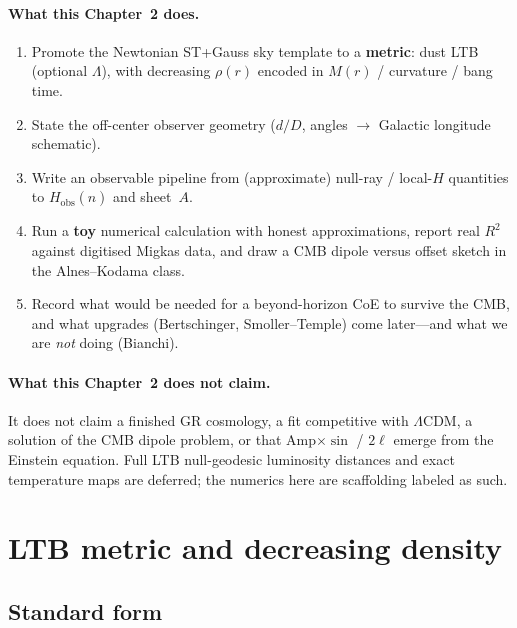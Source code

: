 \documentclass[11pt,a4paper]{article}
\begin{document}
\paragraph{What this Chapter~2 does.}
\begin{enumerate}[leftmargin=*,itemsep=2pt]
\item Promote the Newtonian ST+Gauss sky template to a \textbf{metric}: dust
  LTB (optional $\Lambda$), with decreasing $\rho(r)$ encoded in $M(r)$ /
  curvature / bang time.
\item State the off-center observer geometry ($d/D$, angles $\to$ Galactic
  longitude schematic).
\item Write an observable pipeline from (approximate) null-ray / local-$H$
  quantities to $H_{\mathrm{obs}}(\hat n)$ and sheet~$A$.
\item Run a \textbf{toy} numerical calculation with honest approximations,
  report real $R^2$ against digitised Migkas data, and draw a CMB dipole versus
  offset sketch in the Alnes--Kodama class.
\item Record what would be needed for a beyond-horizon CoE to survive the CMB,
  and what upgrades (Bertschinger, Smoller--Temple) come later---and what we
  are \emph{not} doing (Bianchi).
\end{enumerate}

\paragraph{What this Chapter~2 does not claim.}
It does not claim a finished GR cosmology, a fit competitive with $\Lambda$CDM,
a solution of the CMB dipole problem, or that Amp$\times\sin$ / $2\ell$ emerge
from the Einstein equation. Full LTB null-geodesic luminosity distances and
exact temperature maps are deferred; the numerics here are scaffolding labeled
as such.

\section{LTB metric and decreasing density}
\label{sec:ltb}

\subsection{Standard form}
\end{document}
